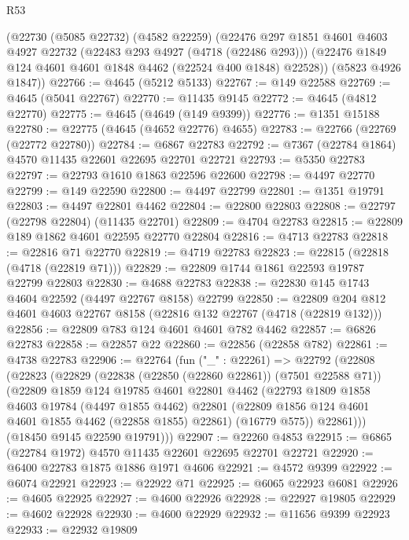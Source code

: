 \begin{lexlean}{R53}
\begin{coremodule}
    (@22730
      (@5085 @22732)
      (@4582 @22259)
      (@22476
        @297
        @1851
        @4601
        @4603
        @4927
        @22732
        (@22483 @293 @4927 (@4718 (@22486 @293)))
        (@22476 @1849 @124 @4601 @4601 @1848 @4462 (@22524 @400 @1848) @22528))
      (@5823 @4926 @1847))
@22766 := @4645 (@5212 @5133)
@22767 := @149 @22588
@22769 := @4645 (@5041 @22767)
@22770 := @11435 @9145
@22772 := @4645 (@4812 @22770)
@22775 := @4645 (@4649 (@149 @9399))
@22776 := @1351 @15188
@22780 := @22775 (@4645 (@4652 @22776) @4655)
@22783 := @22766 (@22769 (@22772 @22780))
@22784 := @6867 @22783
@22792 := @7367 (@22784 @1864) @4570 @11435 @22601 @22695 @22701 @22721
@22793 := @5350 @22783
@22797 := @22793 @1610 @1863 @22596 @22600
@22798 := @4497 @22770
@22799 := @149 @22590
@22800 := @4497 @22799
@22801 := @1351 @19791
@22803 := @4497 @22801 @4462
@22804 := @22800 @22803
@22808 := @22797 (@22798 @22804) (@11435 @22701)
@22809 := @4704 @22783
@22815 := @22809 @189 @1862 @4601 @22595 @22770 @22804
@22816 := @4713 @22783
@22818 := @22816 @71 @22770
@22819 := @4719 @22783
@22823 := @22815 (@22818 (@4718 (@22819 @71)))
@22829 := @22809 @1744 @1861 @22593 @19787 @22799 @22803
@22830 := @4688 @22783
@22838 := @22830 @145 @1743 @4604 @22592 (@4497 @22767 @8158) @22799
@22850 := @22809 @204 @812 @4601 @4603 @22767 @8158 (@22816 @132 @22767 (@4718 (@22819 @132)))
@22856 := @22809 @783 @124 @4601 @4601 @782 @4462
@22857 := @6826 @22783
@22858 := @22857 @22
@22860 := @22856 (@22858 @782)
@22861 := @4738 @22783
@22906 := @22764
    (fun ("_" : @22261) =>
    @22792
      (@22808
        (@22823
          (@22829
            (@22838 (@22850 (@22860 @22861)) (@7501 @22588 @71))
            (@22809
              @1859
              @124
              @19785
              @4601
              @22801
              @4462
              (@22793
                @1809
                @1858
                @4603
                @19784
                (@4497 @1855 @4462)
                @22801
                (@22809 @1856 @124 @4601 @4601 @1855 @4462 (@22858 @1855) @22861)
                (@16779 @575))
              @22861)))
        (@18450 @9145 @22590 @19791)))
@22907 := @22260 @4853
@22915 := @6865 (@22784 @1972) @4570 @11435 @22601 @22695 @22701 @22721
@22920 := @6400 @22783 @1875 @1886 @1971 @4606
@22921 := @4572 @9399
@22922 := @6074 @22921
@22923 := @22922 @71
@22925 := @6065 @22923 @6081
@22926 := @4605 @22925
@22927 := @4600 @22926
@22928 := @22927 @19805
@22929 := @4602 @22928
@22930 := @4600 @22929
@22932 := @11656 @9399 @22923
@22933 := @22932 @19809

\end{coremodule}
\end{lexlean}
